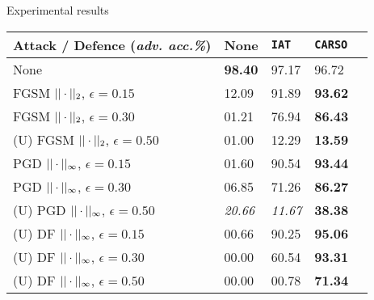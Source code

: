 \setcounter{footnote}{0}

\begin{frame}{ Experimental results}
    \vspace*{11px}

    \centering
    \begin{tabular}{@{}lllll@{}}
        \toprule
        Attack / Defence (\textit{adv. acc.\%})            & None           & \texttt{IAT}   & \texttt{CARSO} &   \\
        \midrule
        None                                               & \textbf{98.40} & 97.17          & 96.72          &   \\
        \midrule
        FGSM $||\cdot||_2$, $\epsilon=0.15$           & 12.09          & 91.89          & \textbf{93.62} &   \\
        FGSM $||\cdot||_2$, $\epsilon=0.30$           & 01.21          & 76.94          & \textbf{86.43} &   \\
        \midrule
        (U) FGSM $||\cdot||_2$, $\epsilon=0.50$       & 01.00          & 12.29          & \textbf{13.59} &   \\
        \midrule
        PGD $||\cdot||_{\infty}$, $\epsilon=0.15$     & 01.60          & 90.54          & \textbf{93.44} &   \\
        PGD $||\cdot||_{\infty}$, $\epsilon=0.30$     & 06.85          & 71.26          & \textbf{86.27} &   \\
        \midrule
        (U) PGD $||\cdot||_{\infty}$, $\epsilon=0.50$ & \textit{20.66} & \textit{11.67} & \textbf{38.38} &   \\
        \midrule
        (U) DF $||\cdot||_{\infty}$, $\epsilon=0.15$  & 00.66          & 90.25          & \textbf{95.06} &   \\
        (U) DF $||\cdot||_{\infty}$, $\epsilon=0.30$  & 00.00          & 60.54          & \textbf{93.31} &   \\
        (U) DF $||\cdot||_{\infty}$, $\epsilon=0.50$  & 00.00          & 00.78          & \textbf{71.34} &   \\ \bottomrule
    \end{tabular}
\end{frame}
